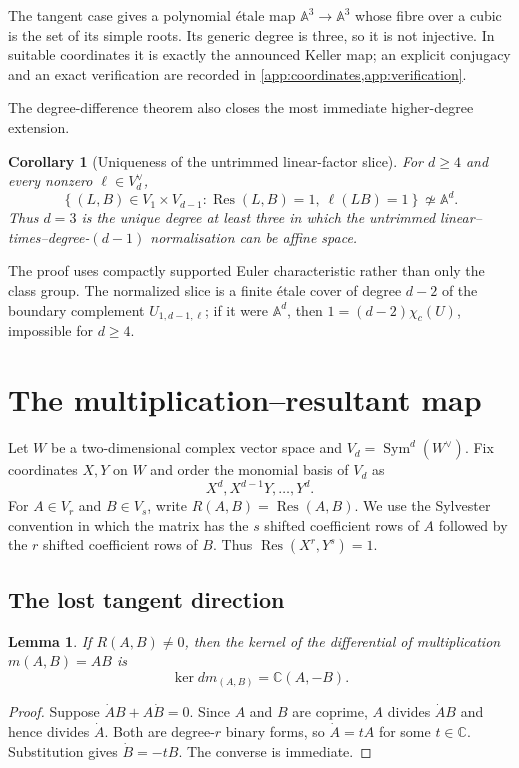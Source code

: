 \documentclass[11pt,reqno]{amsart}
\newtheorem{corollary}[corollary]{Corollary}
\newtheorem{lemma}[lemma]{Lemma}
\theoremstyle{definition}
\theoremstyle{remark}
\newcommand{\A}{\mathbb A}
\newcommand{\C}{\mathbb C}
\newcommand{\Res}{\operatorname{Res}}
\newcommand{\Sym}{\operatorname{Sym}}
\newcommand{\set}[1]{\left\{#1\right\}}
\begin{document}
The tangent case gives a polynomial étale map $\A^3\to\A^3$ whose fibre
over a cubic is the set of its simple roots.  Its generic degree is three,
so it is not injective.  In suitable coordinates it is exactly the
announced Keller map; an explicit conjugacy and an exact verification are
recorded in \cref{app:coordinates,app:verification}.

The degree-difference theorem also closes the most immediate
higher-degree extension.

\begin{corollary}[Uniqueness of the untrimmed linear-factor slice]
\label{cor:unique-degree-intro}
For $d\ge4$ and every nonzero $\ell\in V_d^\vee$,
\[
 \set{(L,B)\in V_1\times V_{d-1}:
 \Res(L,B)=1,\ \ell(LB)=1}
 \not\simeq\A^d.
\]
Thus $d=3$ is the unique degree at least three in which the untrimmed
linear--times--degree-$(d-1)$ normalisation can be affine space.
\end{corollary}

The proof uses compactly supported Euler characteristic rather than only
the class group.  The normalized slice is a finite étale cover of degree
$d-2$ of the boundary complement $U_{1,d-1,\ell}$; if it were $\A^d$, then
$1=(d-2)\chi_c(U)$, impossible for $d\ge4$.

\section{The multiplication--resultant map}

Let $W$ be a two-dimensional complex vector space and
$V_d=\Sym^d(W^\vee)$.  Fix coordinates $X,Y$ on $W$ and order the
monomial basis of $V_d$ as
\[
 X^d,X^{d-1}Y,\ldots,Y^d.
\]
For $A\in V_r$ and $B\in V_s$, write $R(A,B)=\Res(A,B)$.
We use the Sylvester convention in which the matrix has the $s$ shifted
coefficient rows of $A$ followed by the $r$ shifted coefficient rows of
$B$.  Thus $\Res(X^r,Y^s)=1$.

\subsection{The lost tangent direction}

\begin{lemma}\label{lem:kernel-multiplication}
If $R(A,B)\ne0$, then the kernel of the differential of multiplication
$m(A,B)=AB$ is
\[
 \ker dm_{(A,B)}=\C(A,-B).
\]
\end{lemma}

\begin{proof}
Suppose $\dot A B+A\dot B=0$.  Since $A$ and $B$ are coprime, $A$ divides
$\dot A B$ and hence divides $\dot A$.  Both are degree-$r$ binary forms,
so $\dot A=tA$ for some $t\in\C$.  Substitution gives
$\dot B=-tB$.  The converse is immediate.
\end{proof}
\end{document}
